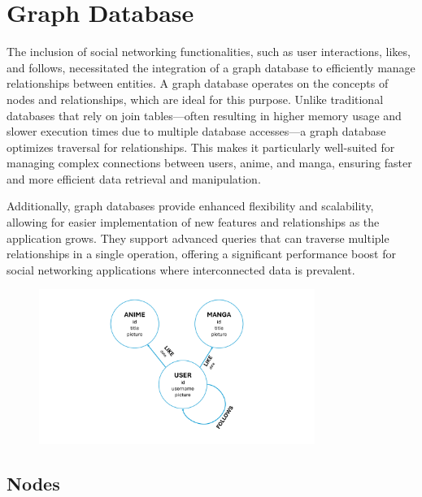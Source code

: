 \vspace{\baselineskip}

\section{Graph Database}

The inclusion of social networking functionalities, such as user interactions, likes, and follows, necessitated the 
integration of a graph database to efficiently manage relationships between entities. A graph database operates on 
the concepts of nodes and relationships, which are ideal for this purpose. Unlike traditional databases that rely on 
join tables—often resulting in higher memory usage and slower execution times due to multiple database accesses—a graph 
database optimizes traversal for relationships. This makes it particularly well-suited for managing complex connections 
between users, anime, and manga, ensuring faster and more efficient data retrieval and manipulation.

\vspace{\baselineskip}

Additionally, graph databases provide enhanced flexibility and scalability, allowing for easier implementation of 
new features and relationships as the application grows. They support advanced queries that can traverse multiple 
relationships in a single operation, offering a significant performance boost for social networking applications 
where interconnected data is prevalent.

\begin{figure}[htbp]\label{fig:GraphDB}
  \centering
  \includegraphics[width=0.8\textwidth]{Media/graph.pdf}
\end{figure}

\newpage

\subsection*{Nodes}

